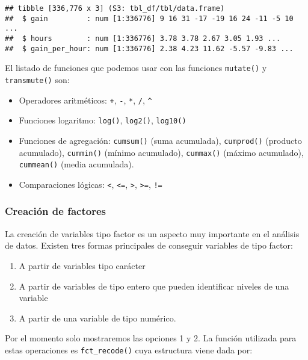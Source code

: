 \documentclass[
]{book}
\providecommand{\tightlist}{%
  \setlength{\itemsep}{0pt}\setlength{\parskip}{0pt}}
\begin{document}
\begin{verbatim}
## tibble [336,776 x 3] (S3: tbl_df/tbl/data.frame)
##  $ gain         : num [1:336776] 9 16 31 -17 -19 16 24 -11 -5 10 ...
##  $ hours        : num [1:336776] 3.78 3.78 2.67 3.05 1.93 ...
##  $ gain_per_hour: num [1:336776] 2.38 4.23 11.62 -5.57 -9.83 ...
\end{verbatim}

El listado de funciones que podemos usar con las funciones \texttt{mutate()} y \texttt{transmute()} son:

\begin{itemize}
\tightlist
\item
  Operadores aritméticos: \texttt{+}, \texttt{-}, \texttt{*}, \texttt{/}, \texttt{\^{}}
\item
  Funciones logaritmo: \texttt{log()}, \texttt{log2()}, \texttt{log10()}
\item
  Funciones de agregación: \texttt{cumsum()} (suma acumulada), \texttt{cumprod()} (producto acumulado), \texttt{cummin()} (mínimo acumulado), \texttt{cummax()} (máximo acumulado), \texttt{cummean()} (media acumulada).
\item
  Comparaciones lógicas: \texttt{\textless{}}, \texttt{\textless{}=}, \texttt{\textgreater{}}, \texttt{\textgreater{}=}, \texttt{!=}
\end{itemize}

\hypertarget{creaciuxf3n-de-factores}{%
\subsubsection{Creación de factores}\label{creaciuxf3n-de-factores}}

La creación de variables tipo factor es un aspecto muy importante en el análisis de datos. Existen tres formas principales de conseguir variables de tipo factor:

\begin{enumerate}
\def\labelenumi{\arabic{enumi}.}
\tightlist
\item
  A partir de variables tipo carácter
\item
  A partir de variables de tipo entero que pueden identificar niveles de una variable
\item
  A partir de una variable de tipo numérico.
\end{enumerate}

Por el momento solo mostraremos las opciones 1 y 2. La función utilizada para estas operaciones es \texttt{fct\_recode()} cuya estructura viene dada por:
\end{document}
